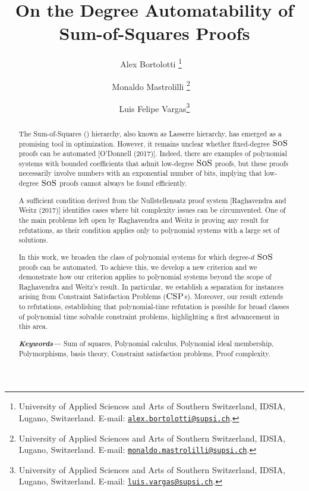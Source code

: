 \documentclass[11pt]{article}
\title{On the Degree Automatability of Sum-of-Squares Proofs} \date{}
\author{Alex Bortolotti \thanks{University of Applied Sciences and Arts of Southern Switzerland, IDSIA, Lugano, Switzerland. E-mail: \href{mailto:alex.bortolotti@supsi.ch}{\texttt{alex.bortolotti@supsi.ch}}.} \  \and Monaldo Mastrolilli \thanks{University of Applied Sciences and Arts of Southern Switzerland, IDSIA, Lugano, Switzerland. E-mail: \href{mailto:monaldo.mastrolilli@supsi.ch}{\texttt{monaldo.mastrolilli@supsi.ch}}.} \ \and Luis Felipe Vargas\thanks{University of Applied Sciences and Arts of Southern Switzerland, IDSIA, Lugano, Switzerland. E-mail: \href{mailto:luis.vargas@supsi.ch}{\texttt{luis.vargas@supsi.ch}}.}}
\providecommand{\keywords}[1]
{
  \small	
  \textbf{\textit{Keywords---}} #1
}
\newcommand{\sos}{\text{\sc{SoS}}}
\newcommand{\CSP}{\textsc{CSP}}
\newcommand{\1}{\textbf{1}}
\newcommand{\GB}{\text{Gr\"{o}bner} }
\begin{document}
\maketitle


\begin{abstract}
The Sum-of-Squares (\sos) hierarchy, also known as Lasserre hierarchy, has emerged as a promising tool in optimization.
However, it remains unclear whether fixed-degree $\sos$ proofs can be automated [O'Donnell (2017)].
Indeed, there are examples of polynomial systems with bounded coefficients that admit low-degree $\sos$ proofs, but these proofs necessarily involve numbers with an exponential number of bits, implying that low-degree $\sos$ proofs cannot always be found efficiently.
 
A sufficient condition derived from the Nullstellensatz proof system [Raghavendra and Weitz (2017)] identifies cases where bit complexity issues can be circumvented.
One of the main problems left open by Raghavendra and Weitz is proving any result for refutations, as their condition applies only to polynomial systems with a large set of solutions.

In this work, we broaden the class of polynomial systems for which degree-$d$ $\sos$ proofs can be automated. To achieve this, we develop a new criterion and we demonstrate how our criterion applies to polynomial systems beyond the scope of Raghavendra and Weitz's result. In particular, we establish a separation for instances arising from Constraint Satisfaction Problems ($\CSP$s).
Moreover, our result extends to refutations, establishing that polynomial-time refutation is possible for broad classes of polynomial time solvable constraint problems, highlighting a first advancement in this area.

\noindent\keywords{Sum of squares, Polynomial calculus, Polynomial ideal membership, Polymorphisms, \GB basis theory, Constraint satisfaction problems, Proof complexity.}
\end{abstract}
\newpage
{
  \hypersetup{linkcolor=black}
  \tableofcontents
}



\newpage
\end{document}
